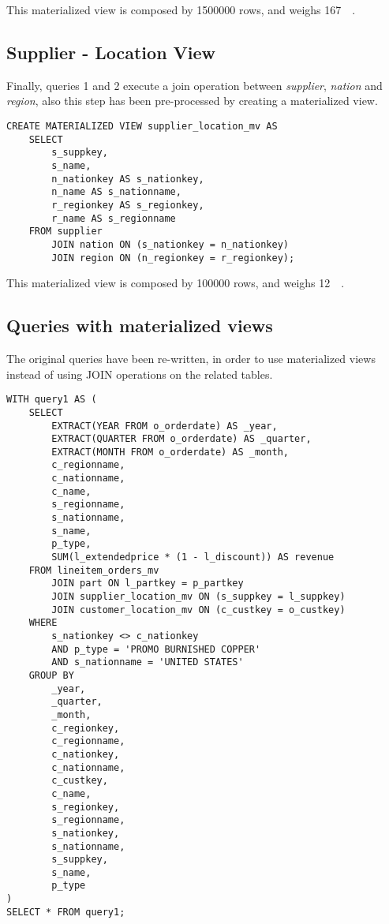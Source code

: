 This materialized view is composed by \num{1500000} rows, and weighs \SI{167}{\mega\byte}.

\subsection{Supplier - Location View}
Finally, queries 1 and 2 execute a join operation between \textit{supplier}, \textit{nation} and \textit{region}, also this step has been pre-processed by creating a materialized view.

\begin{lstlisting}
CREATE MATERIALIZED VIEW supplier_location_mv AS
	SELECT 
		s_suppkey, 
		s_name, 
		n_nationkey AS s_nationkey, 
		n_name AS s_nationname, 
		r_regionkey AS s_regionkey, 
		r_name AS s_regionname 
	FROM supplier 
		JOIN nation ON (s_nationkey = n_nationkey)
		JOIN region ON (n_regionkey = r_regionkey);
\end{lstlisting}

This materialized view is composed by \num{100000} rows, and weighs \SI{12}{\mega\byte}.

\subsection{Queries with materialized views}
\label{subsection:queriesmaterilizedviews}

The original queries have been re-written, in order to use materialized views instead of using JOIN operations on the related tables.

\begin{lstlisting}
WITH query1 AS (
	SELECT
		EXTRACT(YEAR FROM o_orderdate) AS _year,
		EXTRACT(QUARTER FROM o_orderdate) AS _quarter,
		EXTRACT(MONTH FROM o_orderdate) AS _month,
		c_regionname,
		c_nationname,
		c_name,
		s_regionname,
		s_nationname,
		s_name,
		p_type,
		SUM(l_extendedprice * (1 - l_discount)) AS revenue
	FROM lineitem_orders_mv 
		JOIN part ON l_partkey = p_partkey
		JOIN supplier_location_mv ON (s_suppkey = l_suppkey)
		JOIN customer_location_mv ON (c_custkey = o_custkey)
	WHERE
		s_nationkey <> c_nationkey
		AND p_type = 'PROMO BURNISHED COPPER'
		AND s_nationname = 'UNITED STATES'
	GROUP BY
		_year,
		_quarter,
		_month,
		c_regionkey,
		c_regionname,
		c_nationkey,
		c_nationname,
		c_custkey,
		c_name,
		s_regionkey,
		s_regionname,
		s_nationkey,
		s_nationname,
		s_suppkey,
		s_name,
		p_type
)
SELECT * FROM query1;
\end{lstlisting}

